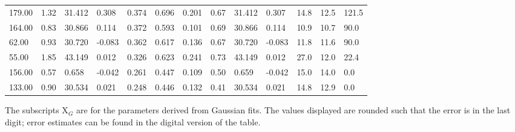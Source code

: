 \begin{table}[htp]
{\begin{tabular}{lllllllllllll}
179.00 & 1.32 & 31.412 & 0.308 & 0.374 & 0.696 & 0.201 & 0.67 & 31.412 & 0.307 & 14.8 & 12.5 & 121.5 \\
164.00 & 0.83 & 30.866 & 0.114 & 0.372 & 0.593 & 0.101 & 0.69 & 30.866 & 0.114 & 10.9 & 10.7 & 90.0 \\
62.00 & 0.93 & 30.720 & -0.083 & 0.362 & 0.617 & 0.136 & 0.67 & 30.720 & -0.083 & 11.8 & 11.6 & 90.0 \\
55.00 & 1.85 & 43.149 & 0.012 & 0.326 & 0.623 & 0.241 & 0.73 & 43.149 & 0.012 & 27.0 & 12.0 & 22.4 \\
156.00 & 0.57 & 0.658 & -0.042 & 0.261 & 0.447 & 0.109 & 0.50 & 0.659 & -0.042 & 15.0 & 14.0 & 0.0 \\
133.00 & 0.90 & 30.534 & 0.021 & 0.248 & 0.446 & 0.132 & 0.41 & 30.534 & 0.021 & 14.8 & 12.9 & 0.0 \\
\hline
\end{tabular}
}\par
The subscripts X${_G}$ are for the parameters derived from Gaussian fits.  The values displayed are rounded such that the error is in the last digit; error estimates can be found in the digital version of the table.
\end{table}
